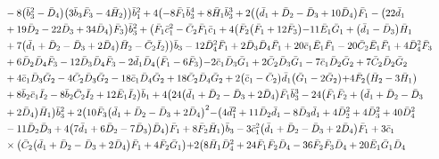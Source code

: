 \documentclass[10pt]{amsart}
\theoremstyle{definition}
\theoremstyle{corollary}
\theoremstyle{remark}
\theoremstyle{conclusion}
\begin{document}
\begin{align}
& \hskip 0.7cm-8 \bigl(\bar{b}_3^2-\bar{D}_4\bigl) \bigl(3 \bar{b}_3 \bar{F}_3-4 \bar{H}_2\bigl)\bigl) \bar{b}_1^2+4 \bigl(-8 \bar{F}_1 \bar{b}_3^4+8 \bar{H}_1 \bar{b}_3^3+2 \bigl(\bigl(\bar{d}_1+\bar{D}_2-\bar{D}_3+10 \bar{D}_4\bigl) \bar{F}_1-\bigl(22 \bar{d}_1\nonumber \\
& \hskip 0.7cm+19 \bar{D}_2-22 \bar{D}_3+34 \bar{D}_4\bigl) \bar{F}_3\bigl) \bar{b}_3^2+\bigl(\bar{F}_1 \bar{c}_1^2-\bar{C}_2 \bar{F}_1 \bar{c}_1+4 \bigl(\bar{F}_2 \bigl(\bar{F}_1+12 \bar{F}_3\bigl)-11 \bar{E}_1 \bar{G}_1+\bigl(\bar{d}_1-\bar{D}_3\bigl) \bar{H}_1\nonumber \\
& \hskip 0.7cm+7 \bigl(\bar{d}_1+\bar{D}_2-\bar{D}_3+2 \bar{D}_4\bigl) \bar{H}_2-\bar{C}_2 \bar{I}_2\bigl)\bigl) \bar{b}_3-12 \bar{D}_4^2 \bar{F}_1+2 \bar{D}_3 \bar{D}_4 \bar{F}_1+20 \bar{c}_1 \bar{E}_1 \bar{F}_1-20 \bar{C}_2 \bar{E}_1 \bar{F}_1+4 \bar{D}_4^2 \bar{F}_3\nonumber \\
& \hskip 0.7cm+6 \bar{D}_2 \bar{D}_4 \bar{F}_3-12 \bar{D}_3 \bar{D}_4 \bar{F}_3-2 \bar{d}_1 \bar{D}_4 \bigl(\bar{F}_1-6 \bar{F}_3\bigl)-2 \bar{c}_1 \bar{D}_3 \bar{G}_1+2 \bar{C}_2 \bar{D}_3 \bar{G}_1-7 \bar{c}_1 \bar{D}_2 \bar{G}_2+7 \bar{C}_2 \bar{D}_2 \bar{G}_2\nonumber \\
& \hskip 0.7cm+4 \bar{c}_1 \bar{D}_3 \bar{G}_2-4 \bar{C}_2 \bar{D}_3 \bar{G}_2-18 \bar{c}_1 \bar{D}_4 \bar{G}_2+18 \bar{C}_2 \bar{D}_4 \bar{G}_2+2 \bigl(\bar{c}_1-\bar{C}_2\bigl) \bar{d}_1 \bigl(\bar{G}_1-2 \bar{G}_2\bigl)+4 \bar{F}_2 \bigl(\bar{H}_2-3 \bar{H}_1\bigl)\nonumber \\
& \hskip 0.7cm+8 \bar{b}_2 \bar{c}_1 \bar{I}_2-8 \bar{b}_2 \bar{C}_2 \bar{I}_2+12 \bar{E}_1 \bar{I}_2\bigl) \bar{b}_1+4 \bigl(24 \bigl(\bar{d}_1+\bar{D}_2-\bar{D}_3+2 \bar{D}_4\bigl) \bar{F}_1 \bar{b}_3^3-24 \bigl(\bar{F}_1 \bar{F}_2+\bigl(\bar{d}_1+\bar{D}_2-\bar{D}_3\nonumber \\
& \hskip 0.7cm+2 \bar{D}_4\bigl) \bar{H}_1\bigl) \bar{b}_3^2+2 \bigl(10 \bar{F}_3 \bigl(\bar{d}_1+\bar{D}_2-\bar{D}_3+2 \bar{D}_4\bigl)^2-\bigl(4 \bar{d}_1^2+11 \bar{D}_2 \bar{d}_1-8 \bar{D}_3 \bar{d}_1+4 \bar{D}_2^2+4 \bar{D}_3^2+40 \bar{D}_4^2\nonumber \\
& \hskip 0.7cm-11 \bar{D}_2 \bar{D}_3+4 \bigl(7 \bar{d}_1+6 \bar{D}_2-7 \bar{D}_3\bigl) \bar{D}_4\bigl) \bar{F}_1+8 \bar{F}_2 \bar{H}_1\bigl) \bar{b}_3-3 \bar{c}_1^2 \bigl(\bar{d}_1+\bar{D}_2-\bar{D}_3+2 \bar{D}_4\bigl) \bar{F}_1+3 \bar{c}_1\nonumber  \\
& \hskip 0.7cm \times \bigl(\bar{C}_2 \bigl(\bar{d}_1+\bar{D}_2-\bar{D}_3+2 \bar{D}_4\bigl)\bar{F}_1+4 \bar{F}_2 \bar{G}_1\bigl)+2 \bigl(8 \bar{H}_1 \bar{D}_4^2+24 \bar{F}_1 \bar{F}_2 \bar{D}_4-36 \bar{F}_2 \bar{F}_3 \bar{D}_4+20 \bar{E}_1 \bar{G}_1 \bar{D}_4\nonumber \\

\end{align}
\end{document}
